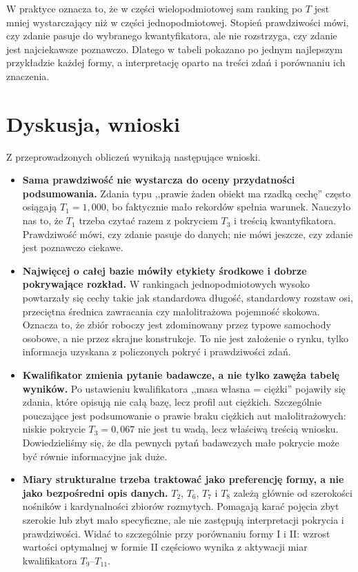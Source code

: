 \documentclass{article}
\begin{document}
W praktyce oznacza to, że w części wielopodmiotowej sam ranking po $T$ jest
mniej wystarczający niż w części jednopodmiotowej. Stopień prawdziwości
mówi, czy zdanie pasuje do wybranego kwantyfikatora, ale nie rozstrzyga,
czy zdanie jest najciekawsze poznawczo. Dlatego w tabeli pokazano po jednym
najlepszym przykładzie każdej formy, a interpretację oparto na treści
zdań i porównaniu ich znaczenia.


\section{Dyskusja, wnioski}

Z przeprowadzonych obliczeń wynikają następujące wnioski.

\begin{itemize}
    \item \textbf{Sama prawdziwość nie wystarcza do oceny przydatności
    podsumowania.} Zdania typu ,,prawie żaden obiekt ma rzadką cechę'' często
    osiągają $T_1=1{,}000$, bo faktycznie mało rekordów spełnia warunek.
    Nauczyło nas to, że $T_1$ trzeba czytać razem z pokryciem $T_3$ i treścią
    kwantyfikatora. Prawdziwość mówi, czy zdanie pasuje do danych; nie mówi
    jeszcze, czy zdanie jest poznawczo ciekawe.

    \item \textbf{Najwięcej o całej bazie mówiły etykiety środkowe i dobrze
    pokrywające rozkład.} W rankingach jednopodmiotowych wysoko powtarzały
    się cechy takie jak standardowa długość, standardowy rozstaw osi,
    przeciętna średnica zawracania czy małolitrażowa pojemność skokowa.
    Oznacza to, że zbiór roboczy jest zdominowany przez typowe samochody
    osobowe, a nie przez skrajne konstrukcje. To nie jest założenie o rynku,
    tylko informacja uzyskana z policzonych pokryć i prawdziwości zdań.

    \item \textbf{Kwalifikator zmienia pytanie badawcze, a nie tylko zawęża
    tabelę wyników.} Po ustawieniu kwalifikatora ,,masa własna = ciężki''
    pojawiły się zdania, które opisują nie całą bazę, lecz profil aut ciężkich.
    Szczególnie pouczające jest podsumowanie o prawie braku ciężkich aut
    małolitrażowych: niskie pokrycie $T_3=0{,}067$ nie jest tu wadą, lecz
    właściwą treścią wniosku. Dowiedzieliśmy się, że dla pewnych pytań
    badawczych małe pokrycie może być równie informacyjne jak duże.

    \item \textbf{Miary strukturalne trzeba traktować jako preferencję formy,
    a nie jako bezpośredni opis danych.} $T_2$, $T_6$, $T_7$ i $T_8$ zależą
    głównie od szerokości nośników i kardynalności zbiorów rozmytych.
    Pomagają karać pojęcia zbyt szerokie lub zbyt mało specyficzne, ale nie
    zastępują interpretacji pokrycia i prawdziwości. Widać to szczególnie
    przy porównaniu formy I i II: wzrost wartości optymalnej w formie II
    częściowo wynika z aktywacji miar kwalifikatora $T_9$--$T_{11}$.


\end{itemize}
\end{document}
